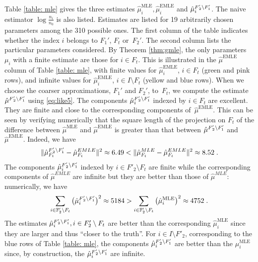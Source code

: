 \documentclass[aos,noinfoline]{imsart}
\DeclareMathOperator{\MLE}{MLE}
\DeclareMathOperator{\EMLE}{EMLE}
\newcommand{\hmuFF}{\hat{\mu}^{F\smash{'_2\setminus F'_1}}}
\def\F{{\mathbb F}}
\theoremstyle{remark}
\theoremstyle{definition}
\begin{document}
Table \ref{table: mle} gives the three estimates $\hat{\mu}_i^{\MLE},
\hat{\mu}_i^{\EMLE}$ and $\hmuFF_{i}$.  The naive estimator $\log \frac{n_i}{n_0}$ is also listed.
Estimates are listed for 19 arbitrarily chosen parameters among the 310 possible ones.
The first column of the table indicates whether the index $i$ belongs to $F_1'$, $F_{t}$ or~$F_{2}'$.
The second column lists the particular parameters considered.  By Theorem \ref{thm:gmle}, the only parameters $\mu_i$ with a finite estimate are those for $i\in F_t$.
This is illustrated in the  $\hat{\mu}^{\EMLE}$ column of Table \ref{table: mle}, with finite values for
$\hat{\mu}_i^{\EMLE}$, $i\in  F_t$ (green and pink rows), and infinite values for $\hat{\mu}_i^{\EMLE}$, $i\in I\setminus F_t$ (yellow and blue rows).  When we choose the coarser approximations, $F_1'$ and $F_2'$, to~$F_t$, we compute the estimate $\hmuFF$  using \eqref{eq:like5}. The components $\hmuFF_i$ indexed by $i\in F_t$ are excellent. They are finite and close to the corresponding components of~$\hat{\mu}^{\EMLE}$.
This can be seen by verifying numerically that the square length of  the projection on $F_t$ of the difference between $\hat{\mu}^{\MLE}$ and $\hat{\mu}^{\EMLE}$ is greater than that between
$\hmuFF$ and $\hat{\mu}^{\EMLE}$. Indeed, we have
\begin{equation*}
\lVert  \hmuFF_{F_t}-\hat{\mu}^{EMLE}_{F_t}\rVert^2 \approx 6.49 < %
\lVert \hat{\mu}^{MLE}_{F_t}-\hat{\mu}^{EMLE}_{F_t}\rVert^2 \approx 8.52\;. %
\end{equation*}
 The components  $\hmuFF_i$ indexed by $i\in F'_2\setminus F_t$   are finite while the corresponding components of $\hat{\mu}^{EMLE}$ are infinite but they are better than those of $\hat{\mu}^{MLE}$: numerically, we have
 \begin{equation*}
  \sum_{i\in\F'_{2}\setminus F_{t}}\left(\hmuFF_{i}\right)^{2} \approx \num{5184}
  > 
  \sum_{i\in\F'_{2}\setminus F_{t}}\left(\hat{\mu}^{\MLE}_{i}\right)^{2} \approx \num{4752}\;.
\end{equation*}
 The estimates $\hmuFF_i, i\in F'_2\setminus F_t$  are better than the corresponding $\hat{\mu}^{\MLE}_{i}$ since they are larger and thus ``closer to the truth''.
 For $i\in I\setminus F'_2$, corresponding to the blue rows of Table \ref{table: mle}, the components
 $\hmuFF_{i}$ are better than the $\mu^{\MLE}_{i}$ since, by construction, the $\hmuFF_{i}$ are infinite.
\end{document}
